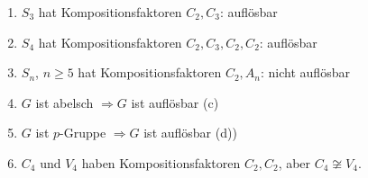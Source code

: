 \begin{example}
	\begin{enumerate}
		\item $S_3$ hat Kompositionsfaktoren $C_2, C_3$: auflösbar
		\item $S_4$ hat Kompositionsfaktoren $C_2,C_3,C_2,C_2$: auflösbar
		\item $S_n$, $n \geq 5$ hat Kompositionsfaktoren $C_2, A_n$: nicht auflösbar
		\item $G$ ist abelsch $\Longrightarrow G$ ist auflösbar (c)
		\item $G$ ist $p$-Gruppe $\Longrightarrow G$ ist auflösbar (d))
		\item $C_4 \text{ und } V_4$ haben Kompositionsfaktoren $C_2, C_2$, aber $C_4 \not\cong V_4$.
	\end{enumerate}
\end{example}